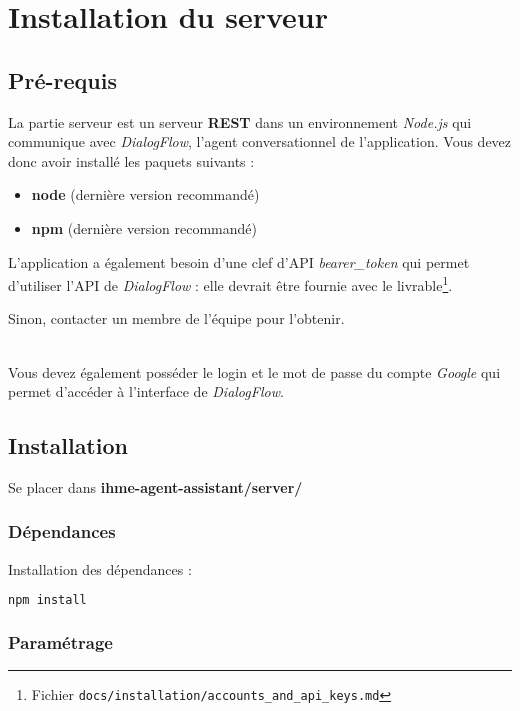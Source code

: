 \chapter{Installation du serveur}

\section{Pré-requis}
La partie serveur est un serveur \textbf{REST} dans un environnement \emph{Node.js} qui communique avec \emph{DialogFlow}, l'agent conversationnel de l'application. Vous devez donc avoir installé les paquets suivants :
\begin{itemize}
\item \textbf{node} (dernière version recommandé)
\item \textbf{npm} (dernière version recommandé)\\
\end{itemize}


L'application a également besoin d'une clef d'API \og \emph{bearer\_token} \fg{} qui permet d'utiliser l'API de \emph{DialogFlow} : elle devrait être fournie avec le livrable\footnote{Fichier \texttt{docs/installation/accounts\_and\_api\_keys.md}}. 

Sinon, contacter un membre de l'équipe pour l'obtenir.

~\\\indent
Vous devez également posséder le login et le mot de passe du compte \emph{Google} qui permet d'accéder à l'interface de \emph{DialogFlow}.

\section{Installation}

Se placer dans \textbf{ihme-agent-assistant/server/}

\subsection{Dépendances}

Installation des dépendances :
  \begin{lstlisting}[language=bash]
    npm install
  \end{lstlisting}

\subsection{Paramétrage}

